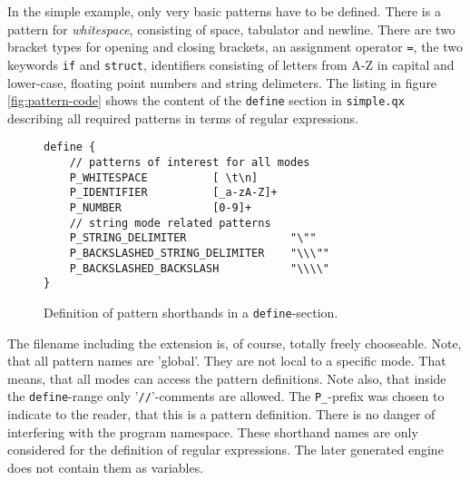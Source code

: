 In the simple example, only very basic patterns have to be defined. There is a
pattern for {\it whitespace}, consisting of space, tabulator and newline.
There are two bracket types for opening and closing brackets, an assignment
operator \verb|=|, the two keywords {\tt if} and {\tt struct}, identifiers
consisting of letters from A-Z in capital and lower-case, floating point
numbers and string delimeters. The listing in figure \ref{fig:pattern-code}
shows the content of the {\tt define} section in {\tt simple.qx} describing all required
patterns in terms of regular expressions.


\begin{figure}
\begin{lstlisting}
define {
    // patterns of interest for all modes
    P_WHITESPACE          [ \t\n]
    P_IDENTIFIER          [_a-zA-Z]+
    P_NUMBER              [0-9]+
    // string mode related patterns
    P_STRING_DELIMITER                "\""
    P_BACKSLASHED_STRING_DELIMITER    "\\\""
    P_BACKSLASHED_BACKSLASH           "\\\\"
}
\end{lstlisting}
\caption{Definition of pattern shorthands in a {\tt define}-section.}
\end{figure}

The filename including the extension is, of course, totally freely chooseable.
Note, that all pattern names are 'global'. They are not local to a specific
mode. That means, that all modes can access the pattern definitions. Note also,
   that inside the {\tt define}-range only '{\tt //}'-comments are allowed.
The {\tt P\_}-prefix was chosen to indicate to the reader, that this is a 
pattern definition. There is no danger of interfering with the program namespace.
These shorthand names are only considered for the definition of regular expressions.
The later generated engine does not contain them as variables.
